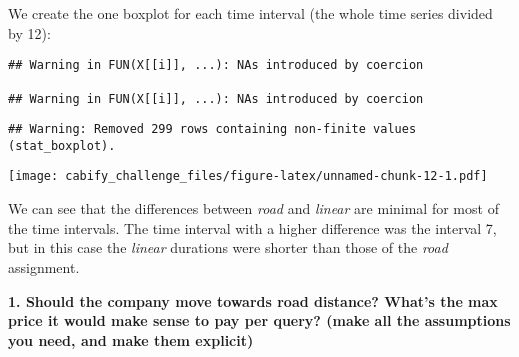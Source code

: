 \documentclass[
]{article}
\newenvironment{Shaded}{\begin{snugshade}}{\end{snugshade}}
\newcommand{\AttributeTok}[1]{\textcolor[rgb]{0.77,0.63,0.00}{#1}}
\newcommand{\CommentTok}[1]{\textcolor[rgb]{0.56,0.35,0.01}{\textit{#1}}}
\newcommand{\DecValTok}[1]{\textcolor[rgb]{0.00,0.00,0.81}{#1}}
\newcommand{\FunctionTok}[1]{\textcolor[rgb]{0.00,0.00,0.00}{#1}}
\newcommand{\NormalTok}[1]{#1}
\newcommand{\OtherTok}[1]{\textcolor[rgb]{0.56,0.35,0.01}{#1}}
\newcommand{\SpecialCharTok}[1]{\textcolor[rgb]{0.00,0.00,0.00}{#1}}
\newcommand{\StringTok}[1]{\textcolor[rgb]{0.31,0.60,0.02}{#1}}
\begin{document}
We create the one boxplot for each time interval (the whole time series
divided by 12):

\begin{Shaded}
\end{Shaded}

\begin{verbatim}
## Warning in FUN(X[[i]], ...): NAs introduced by coercion

## Warning in FUN(X[[i]], ...): NAs introduced by coercion
\end{verbatim}

\begin{verbatim}
## Warning: Removed 299 rows containing non-finite values (stat_boxplot).
\end{verbatim}

\texttt{[image: cabify\_challenge\_files/figure-latex/unnamed-chunk-12-1.pdf]}

We can see that the differences between \emph{road} and \emph{linear}
are minimal for most of the time intervals. The time interval with a
higher difference was the interval 7, but in this case the \emph{linear}
durations were shorter than those of the \emph{road} assignment.

\textbf{1. Should the company move towards road distance? What's the max
price it would make sense to pay per query? (make all the assumptions
you need, and make them explicit)}
\end{document}
